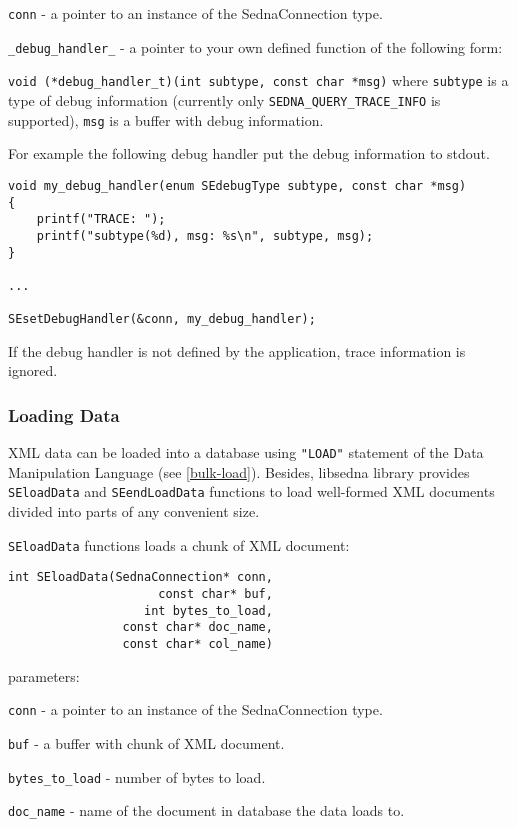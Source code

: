 \documentclass[a4paper,12pt]{article}
\begin{document}
\verb!conn! - a pointer to an instance of the SednaConnection type.

\verb!_debug_handler_! - a pointer to your own defined function of the following form:

\verb!void (*debug_handler_t)(int subtype, const char *msg)! where \verb!subtype! is a type of debug information (currently only \verb!SEDNA_QUERY_TRACE_INFO! is supported), \verb!msg! is a buffer with debug information.

For example the following debug handler put the debug information to stdout.

\begin{verbatim}
void my_debug_handler(enum SEdebugType subtype, const char *msg)
{
   	printf("TRACE: ");
    printf("subtype(%d), msg: %s\n", subtype, msg);
}

...

SEsetDebugHandler(&conn, my_debug_handler);
\end{verbatim}

If the debug handler is not defined by the application, trace information is ignored.

\subsubsection{Loading Data}

XML data can be loaded into a database using \verb!"LOAD"! statement of the Data Manipulation Language (see \ref{bulk-load}). Besides, libsedna library provides \verb!SEloadData! and \verb!SEendLoadData! functions to load well-formed XML documents divided into parts of any convenient size.

\verb!SEloadData! functions loads a chunk of XML document:

\begin{verbatim}
int SEloadData(SednaConnection* conn,
                     const char* buf,
                   int bytes_to_load,
                const char* doc_name,
                const char* col_name)\end{verbatim}

parameters:

\verb!conn! - a pointer to an instance of the SednaConnection type.

\verb!buf! - a buffer with chunk of XML document.

\verb!bytes_to_load! - number of bytes to load.

\verb!doc_name! - name of the document in database the data loads to.
\end{document}
